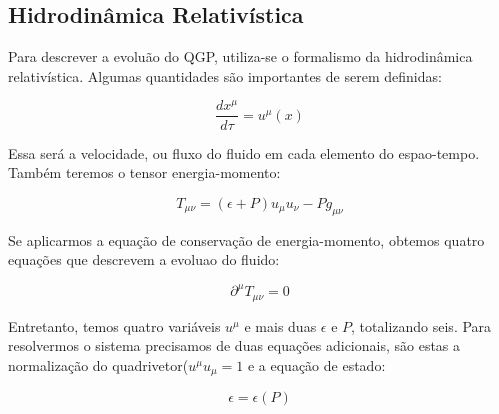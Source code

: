 \subsection{Hidrodinâmica Relativística}

Para descrever a evoluão do QGP, utiliza-se o formalismo da hidrodinâmica relativística. Algumas quantidades são
importantes de serem definidas:

\begin{equation}
 \frac{dx^{\mu}}{d\tau} = u^{\mu}(x)
\end{equation}

Essa será a velocidade, ou fluxo do fluido em cada elemento do espao-tempo. Também teremos o tensor energia-momento:

\begin{equation}
 T_{\mu \nu} = (\epsilon + P) u_\mu u_\nu - P g_{\mu \nu}
\end{equation}

Se aplicarmos a equação de conservação de energia-momento, obtemos quatro equações que descrevem a evoluao do fluido:

\begin{equation}
 \partial^\mu T_{\mu \nu} = 0
\end{equation}

Entretanto, temos quatro variáveis $u^{\mu}$ e mais duas $\epsilon$ e $P$, totalizando seis. Para resolvermos o sistema precisamos
de duas equações adicionais, são estas a normalização do quadrivetor($u^{\mu}u_{\mu}=1$ e a equação de estado:

\begin{equation}
 \epsilon=\epsilon(P)
\end{equation}


